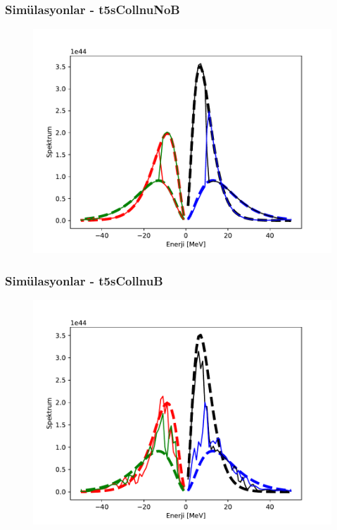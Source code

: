 \documentclass[10pt]{beamer}
\begin{document}
\begin{frame}
    \frametitle{Simülasyonlar - t5sCollnuNoB}
    \begin{figure}[hbt!]
        \centering
        \includegraphics[width=\textwidth]{fig/t5sCollnuNoB_spectrum.pdf}
    \end{figure}
\end{frame}
\begin{frame}
    \frametitle{Simülasyonlar - t5sCollnuB}
    \begin{figure}[hbt!]
        \centering
        \includegraphics[width=\textwidth]{fig/t5sCollnuB_spectrum.pdf}
    \end{figure}
\end{frame}
\end{document}
